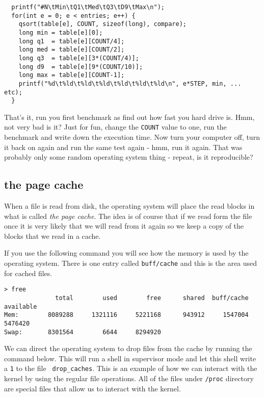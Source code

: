\documentclass[a4paper,11pt]{article}
\begin{document}
\begin{lstlisting}
  printf("#N\tMin\tQ1\tMed\tQ3\tD9\tMax\n");    
  for(int e = 0; e < entries; e++) {
    qsort(table[e], COUNT, sizeof(long), compare);
    long min = table[e][0];
    long q1  = table[e][COUNT/4];
    long med = table[e][COUNT/2];
    long q3  = table[e][3*(COUNT/4)];
    long d9  = table[e][9*(COUNT/10)];    
    long max = table[e][COUNT-1];
    printf("%d\t%ld\t%ld\t%ld\t%ld\t%ld\t%ld\n", e*STEP, min, ... etc);
  }
\end{lstlisting}

That's it, run you first benchmark as find out how fast you hard drive
is. Hmm, not very bad is it? Just for fun, change the {\tt COUNT}
value to one, run the benchmark and write down the execution time. Now
turn your computer off, turn it back on again and run the same test
again - hmm, run it again. That was probably only some random
operating system thing - repeat, is it reproducible?

\subsection*{the page cache}

When a file is read from disk, the operating system will place the
read blocks in what is called {\em the page cache}. The idea is of
course that if we read form the file once it is very likely that we
will read from it again so we keep a copy of the blocks that we read
in a cache. 

If you use the following command you will see how the memory is used
by the operating system. There is one entry called {\tt buff/cache}
and this is the area used for cached files. 

\begin{verbatim}
> free
              total        used        free      shared  buff/cache   available
Mem:        8089288     1321116     5221168      943912     1547004     5476420
Swap:       8301564        6644     8294920
\end{verbatim}

We can direct the operating system to drop files from the cache by
running the command below. This will run a shell in supervisor mode
and let this shell write a {\tt 1} to the file {\tt
  drop\_caches}. This is an example of how we can interact with the
kernel by using the regular file operations. All of the files under
{\tt /proc} directory are special files that allow us to interact with
the kernel.
\end{document}
